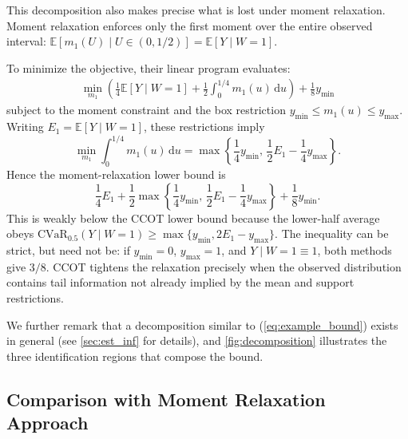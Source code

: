 \begin{example}
    This decomposition also makes precise what is lost under moment relaxation. Moment relaxation enforces only the first moment over the entire observed interval: $\mathbb{E}[m_1(U) \mid U \in (0, 1/2)] = \mathbb{E}[Y \mid W=1]$.

    To minimize the objective, their linear program evaluates:
    \begin{align*}
        \min_{m_1} \left( \frac{1}{4} \mathbb{E}[Y \mid W=1] + \frac{1}{2} \int_0^{1/4} m_1(u) \, \mathrm{d}u \right) + \frac{1}{8} y_{\min}
    \end{align*}
    subject to the moment constraint and the box restriction $y_{\min}\leqslant m_1(u)\leqslant y_{\max}$. Writing $E_1=\mathbb E[Y\mid W=1]$, these restrictions imply
    \[
        \min_{m_1}\int_0^{1/4}m_1(u)\,\mathrm du
        =\max\!\left\{\frac14y_{\min},\,\frac12E_1-\frac14y_{\max}\right\}.
    \]
    Hence the moment-relaxation lower bound is
    \[
        \frac14E_1+\frac12\max\!\left\{\frac14y_{\min},\,\frac12E_1-\frac14y_{\max}\right\}+\frac18y_{\min}.
    \]
    This is weakly below the CCOT lower bound because the lower-half average obeys $\mathrm{CVaR}_{0.5}(Y\mid W=1)\geqslant\max\{y_{\min},2E_1-y_{\max}\}$. The inequality can be strict, but need not be: if $y_{\min}=0$, $y_{\max}=1$, and $Y\mid W=1\equiv1$, both methods give $3/8$. CCOT tightens the relaxation precisely when the observed distribution contains tail information not already implied by the mean and support restrictions.

    We further remark that a decomposition similar to (\ref{eq:example_bound}) exists in general (see \cref{sec:est_inf} for details), and \cref{fig:decomposition} illustrates the three identification regions that compose the bound.
\end{example}

\subsection{Comparison with Moment Relaxation Approach}

